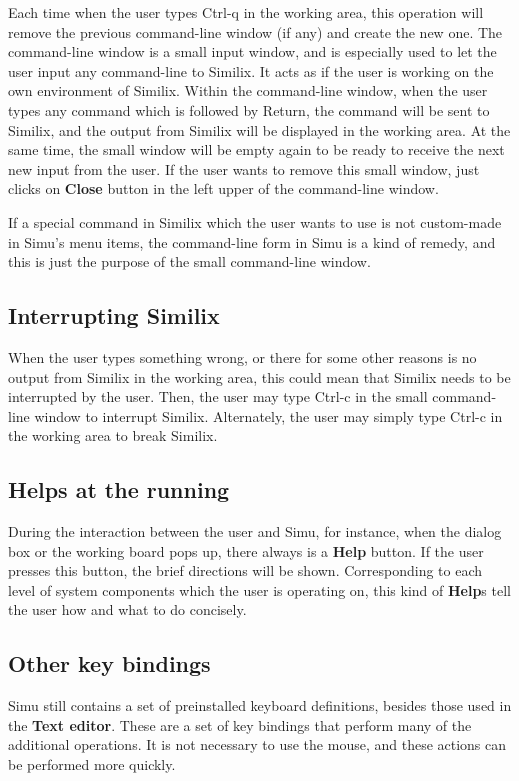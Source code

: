\begin{sloppypar}
Each time when the user types Ctrl-q in the working area, this
operation will remove the previous command-line window (if any) and
create the new one. The command-line window is a small input window,
and is especially used to let the user input any command-line to
Similix. It acts as if the user is working on the own environment of
Similix. Within the command-line window, when the user types any
command which is followed by Return, the command will be sent to
Similix, and the output from Similix will be displayed in the working
area. At the same time, the small window will be empty again to be
ready to receive the next new input from the user. If the user wants
to remove this small window, just clicks on {\bf Close} button in the
left upper of the command-line window.

   If a special command in Similix which the user wants to use is not
custom-made in Simu's menu items, the command-line form in Simu is a
kind of remedy, and this is just the purpose of the small command-line
window.


\subsection{Interrupting Similix}


When the user types something wrong, or there for some other reasons
is no output from Similix in the working area, this could mean that
Similix needs to be interrupted by the user. Then, the user may type
Ctrl-c in the small command-line window to interrupt Similix.
Alternately, the user may simply type Ctrl-c in the working area to
break Similix.


\subsection{Helps at the running}


During the interaction between the user and Simu, for instance, when
the dialog box or the working board pops up, there always is a {\bf
Help} button. If the user presses this button, the brief directions
will be shown. Corresponding to each level of system components which
the user is operating on, this kind of {\bf Help}s tell the user how
and what to do concisely.


\subsection{Other key bindings}


Simu still contains a set of preinstalled keyboard definitions,
besides those used in the {\bf Text editor}. These are a set of key
bindings that perform many of the additional operations. It is not
necessary to use the mouse, and these actions can be performed more
quickly.


\end{sloppypar}
